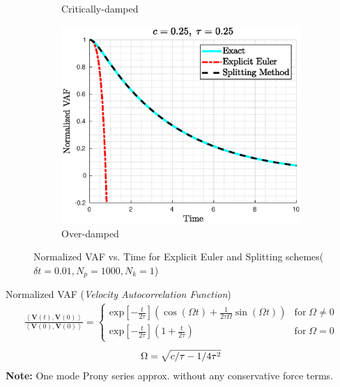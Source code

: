 \documentclass[a4paper,10pt]{beamer}
\newcommand{\BS}[1]{\boldsymbol{#1}}
\newcommand{\sqb}[1]{\left[ #1 \right]}
\newcommand{\rb}[1]{\left( #1 \right)}
\newcommand{\angbrac}[1]{\left \langle #1 \right \rangle}
\begin{document}
\begin{frame}
\begin{figure}[H]
\begin{subfigure}[b]{0.326\linewidth}
				\caption{Critically-damped}
			\end{subfigure}
			\begin{subfigure}[b]{0.326\linewidth}
				\includegraphics[width=\linewidth]{./Plots/CaseStudy/nonnorm_scale_over.eps}
				\caption{Over-damped}
			\end{subfigure}
			\caption{Normalized VAF vs. Time for Explicit Euler and Splitting schemes($\delta t = 0.01, N_{p} = 1000, N_{k} = 1$)}
		\end{figure}
		\vspace{-0.5cm}
		\begin{alertblock}{Normalized VAF (\textit{Velocity Autocorrelation Function})}
			\begin{align}
				\frac{\angbrac{\BS{V}(t),\BS{V}(0)}}{\angbrac{\BS{V}(0),\BS{V}(0)}} = 
				\begin{cases}
				\text{exp} \sqb{-\frac{t}{2 \tau}} \rb{\cos\rb{\Omega t} + \frac{1}{2\tau\Omega} \sin\rb{\Omega t}}  &\text{for} \; \Omega \neq 0 \\
				\text{exp} \sqb{-\frac{t}{2 \tau}} \rb{1 + \frac{t}{2 \tau}} &\text{for} \; \Omega = 0
				\end{cases}
				\label{eq:oneModeExactVAF}
			\end{align}
			\begin{gather}
				\notag
				\Omega = \sqrt{c/\tau - 1/4\tau^{2}}
			\end{gather}
			\textbf{Note:} One mode Prony series approx. without any conservative force terms.
		\end{alertblock}
	\end{frame}
\end{document}
